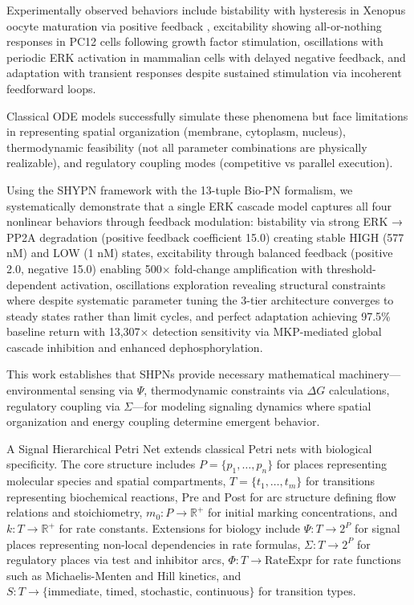 \documentclass[twocolumn,11pt]{article}
\begin{document}
Experimentally observed behaviors include bistability with hysteresis in Xenopus oocyte maturation via positive feedback \citep{ferrell2009}, excitability showing all-or-nothing responses in PC12 cells following growth factor stimulation, oscillations with periodic ERK activation in mammalian cells with delayed negative feedback, and adaptation with transient responses despite sustained stimulation via incoherent feedforward loops.


Classical ODE models successfully simulate these phenomena but face limitations in representing spatial organization (membrane, cytoplasm, nucleus), thermodynamic feasibility (not all parameter combinations are physically realizable), and regulatory coupling modes (competitive vs parallel execution).

Using the SHYPN framework with the 13-tuple Bio-PN formalism, we systematically demonstrate that a single ERK cascade model captures all four nonlinear behaviors through feedback modulation: bistability via strong ERK → PP2A degradation (positive feedback coefficient 15.0) creating stable HIGH (577 nM) and LOW (1 nM) states, excitability through balanced feedback (positive 2.0, negative 15.0) enabling 500× fold-change amplification with threshold-dependent activation, oscillations exploration revealing structural constraints where despite systematic parameter tuning the 3-tier architecture converges to steady states rather than limit cycles, and perfect adaptation achieving 97.5\% baseline return with 13,307× detection sensitivity via MKP-mediated global cascade inhibition and enhanced dephosphorylation.


This work establishes that SHPNs provide necessary mathematical machinery—environmental sensing via $\Psi$, thermodynamic constraints via $\Delta G$ calculations, regulatory coupling via $\Sigma$—for modeling signaling dynamics where spatial organization and energy coupling determine emergent behavior.

A Signal Hierarchical Petri Net extends classical Petri nets with biological specificity. The core structure includes $P = \{p_1, \ldots, p_n\}$ for places representing molecular species and spatial compartments, $T = \{t_1, \ldots, t_m\}$ for transitions representing biochemical reactions, Pre and Post for arc structure defining flow relations and stoichiometry, $m_0: P \to \mathbb{R}^+$ for initial marking concentrations, and $k: T \to \mathbb{R}^+$ for rate constants. Extensions for biology include $\Psi: T \to 2^P$ for signal places representing non-local dependencies in rate formulas, $\Sigma: T \to 2^P$ for regulatory places via test and inhibitor arcs, $\Phi: T \to \text{RateExpr}$ for rate functions such as Michaelis-Menten and Hill kinetics, and $S: T \to \{\text{immediate, timed, stochastic, continuous}\}$ for transition types.
\end{document}
